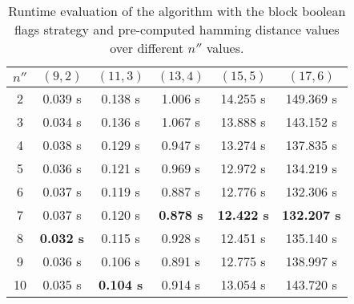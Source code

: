 \begin{table}[h] %
	\renewcommand{\arraystretch}{1.3}
	\label{tbl:nprime-prime-start-value}
	\centering
	\begin{tabular}{|c|c|c|c|c|c|}
		\hline 
		\bfseries\boldmath $n''$ & 
		\bfseries\boldmath $(9,2)$ & 
		\bfseries\boldmath $(11,3)$ & 
		\bfseries\boldmath $(13,4)$ & 
		\bfseries\boldmath $(15,5)$ & 
		\bfseries\boldmath $(17,6)$ \\
		\hline
			2	& 0.039	s & 0.138 s & 1.006	s & 14.255 s &	149.369 s\\
			3	& 0.034	s & 0.136 s & 1.067	s & 13.888 s &	143.152 s\\
			4	& 0.038	s & 0.129 s & 0.947	s & 13.274 s &	137.835 s\\
			5	& 0.036	s & 0.121 s & 0.969	s & 12.972 s &	134.219 s\\
			6	& 0.037	s & 0.119 s & 0.887	s & 12.776 s &	132.306 s\\
			7	& 0.037	s & 0.120 s & \textbf{0.878	s} & \textbf{12.422 s} &	\textbf{132.207 s}\\
			8	& \textbf{0.032	s} & 0.115 s & 0.928	s & 12.451 s &	135.140 s\\
			9	& 0.036	s & 0.106 s	& 0.891	s & 12.775 s &	138.997 s\\
			10	& 0.035	s & \textbf{0.104 s}	& 0.914 s &	13.054 s &	143.720 s\\
		\hline\end{tabular}
	\caption{Runtime evaluation of the algorithm with the block boolean flags strategy and pre-computed hamming distance values over different $n''$ values.}
\end{table}